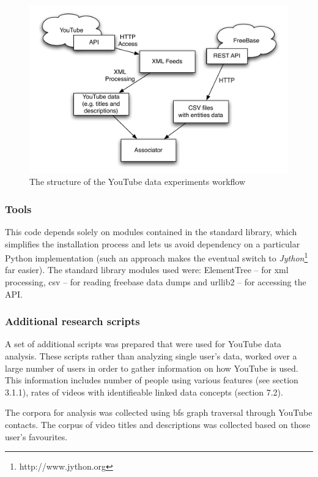 \begin{figure}[h!]
  \begin{center}
	  \includegraphics[scale=0.65]{images/youtube_diagram.pdf}
	  \caption{The structure of the YouTube data experiments workflow}
  \end{center}
\end{figure}

\subsubsection{Tools}
This code depends solely on modules contained in the standard library, which
simplifies the installation process and lets us avoid dependency on a particular
Python implementation (such an approach makes the eventual switch to \textit{Jython}\footnote{http://www.jython.org} far
easier). The standard library modules used were: ElementTree -- for xml
processing, csv -- for reading freebase data dumps and urllib2 -- for accessing
the API.



\subsubsection{Additional research scripts}

A set of additional scripts was prepared that were used for YouTube data
analysis. These scripts rather than analyzing single user's data, worked over a
large number of users in order to gather information on how YouTube is used.
This information includes number of people using various features (see section
3.1.1), rates of videos with identifieable linked data concepts (section 7.2).

The corpora for analysis was collected using bfs graph traversal through YouTube
contacts. The corpus of video titles and descriptions was collected based on
those user's favourites.